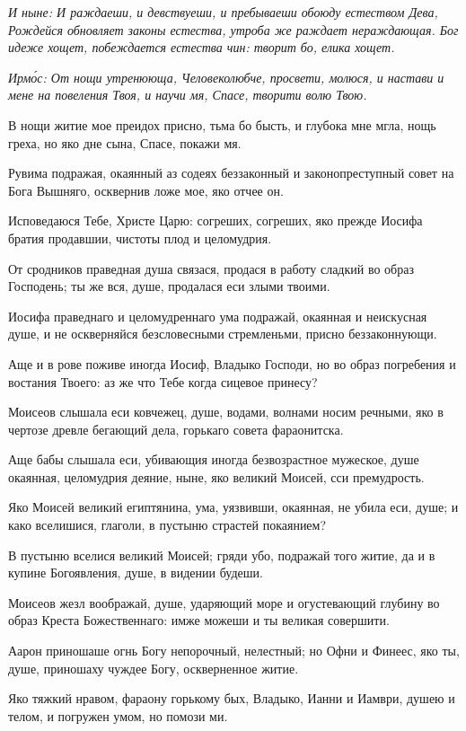 \itshape И ныне\normalfont{}: И раждаеши, и девствуеши, и пребываеши обоюду естеством Дева, Рождейся обновляет законы естества, утроба же раждает нераждающая. Бог идеже хощет, побеждается естества чин: творит бо, елика хощет. 


\itshape Ирм\'{о}с\normalfont{}: От нощи утренююща, Человеколюбче, просвети, молюся, и настави и мене на повеления Твоя, и научи мя, Спасе, творити волю Твою.

В нощи житие мое преидох присно, тьма бо бысть, и глубока мне мгла, нощь греха, но яко дне сына, Спасе, покажи мя.

Рувима подражая, окаянный аз содеях беззаконный и законопреступный совет на Бога Вышняго, осквернив ложе мое, яко отчее он.

Исповедаюся Тебе, Христе Царю: согреших, согреших, яко прежде Иосифа братия продавшии, чистоты плод и целомудрия.

От сродников праведная душа связася, продася в работу сладкий во образ Господень; ты же вся, душе, продалася еси злыми твоими.

Иосифа праведнаго и целомудреннаго ума подражай, окаянная и неискусная душе, и не оскверняйся безсловесными стремленьми, присно беззаконнующи.

Аще и в рове поживе иногда Иосиф, Владыко Господи, но во образ погребения и востания Твоего: аз же что Тебе когда сицевое принесу?

Моисеов слышала еси ковчежец, душе, водами, волнами носим речными, яко в чертозе древле бегающий дела, горькаго совета фараонитска.

Аще бабы слышала еси, убивающия иногда безвозрастное мужеское, душе окаянная, целомудрия деяние, ныне, яко великий Моисей, сси премудрость.

Яко Моисей великий египтянина, ума, уязвивши, окаянная, не убила еси, душе; и како вселишися, глаголи, в пустыню страстей покаянием?

В пустыню вселися великий Моисей; гряди убо, подражай того житие, да и в купине Богоявления, душе, в видении будеши.

Моисеов жезл воображай, душе, ударяющий море и огустевающий глубину во образ Креста Божественнаго: имже можеши и ты великая совершити.

Аарон приношаше огнь Богу непорочный, нелестный; но Офни и Финеес, яко ты, душе, приношаху чуждее Богу, оскверненное житие.

Яко тяжкий нравом, фараону горькому бых, Владыко, Ианни и Иамври, душею и телом, и погружен умом, но помози ми.

